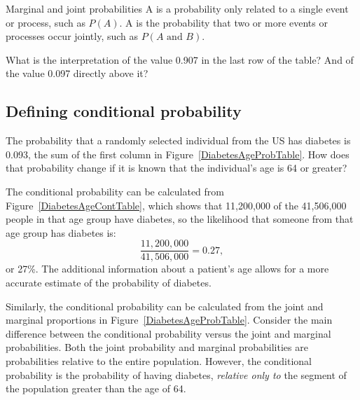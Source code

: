 \begin{onebox}{Marginal and joint probabilities}
A \emph{} is a probability only related to a single event or process, such as $P(A)$. A \emph{} is the probability that two or more events or processes occur jointly, such as $P(A \textrm{ and } B)$.
\end{onebox}

\begin{exercisewrap}
\begin{nexercise}\label{MarginalJointProbDiabetes}%
What is the interpretation of the value 0.907 in the last row of the table?  And of the value 0.097 directly above it?\footnotemark{}
\end{nexercise}
\end{exercisewrap}


\textD{\newpage}


\subsection{Defining conditional probability}


The probability that a randomly selected individual from the US has diabetes is 0.093, the sum of the first column in Figure~\ref{DiabetesAgeProbTable}. How does that probability change if it is known that the individual's age is 64 or greater?  

The conditional probability can be calculated from Figure~\ref{DiabetesAgeContTable}, which shows that 11,200,000 of the 41,506,000 people in that age group have diabetes, so the likelihood that someone from that age group has diabetes is:
\[  
\frac{11,200,000}{41,506,000} = 0.27,
\]
or 27\%. The additional information about a patient's age allows for a more accurate estimate of the probability of diabetes.

Similarly, the conditional probability can be calculated from the joint and marginal proportions in Figure~\ref{DiabetesAgeProbTable}. Consider the main difference between the conditional probability versus the joint and marginal probabilities. Both the joint probability and marginal probabilities are probabilities relative to the entire population. However, the conditional probability is the probability of having diabetes, \textit{relative only to} the segment of the population greater than the age of 64.

